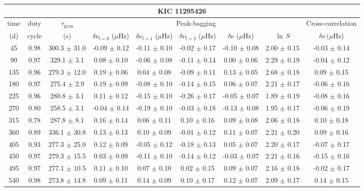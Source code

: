 \documentclass[twocolumn]{aastex61}%
\begin{document}
\begin{table*}[ht]\centering\fontsize{9.}{7.}\selectfont
\begin{tabular}{ccc|ccccc|c}
\multicolumn{9}{c}{KIC 11295426}\\ \hline\hline
time & duty & $\tau_\text{gran}$ &\multicolumn{5}{c|}{Peak-bagging}&Cross-correlation\\
(d)& cycle & (s)&$\delta\nu_{l=0}$ ($\mu$Hz) & $\delta\nu_{l=1}$ ($\mu$Hz) & $\delta\nu_{l=2}$ ($\mu$Hz) & $\delta\nu$ ($\mu$Hz)& $\ln\,S$ & $\delta\nu\,(\mu$Hz)\\\hline
45 & 0.98 & 300.3 $\pm$ 31.0 & -0.09 $\pm$ 0.12 & -0.11 $\pm$ 0.10 & -0.02 $\pm$ 0.17 & -0.10 $\pm$ 0.08 & 2.00 $\pm$ 0.15 & -0.03 $\pm$ 0.14\\
90 & 0.97 & 329.1 $\pm$ 3.1 & 0.08 $\pm$ 0.10 & -0.06 $\pm$ 0.08 & -0.11 $\pm$ 0.14 & 0.00 $\pm$ 0.06 & 2.29 $\pm$ 0.19 & -0.04 $\pm$ 0.12\\
135 & 0.96 & 279.3 $\pm$ 12.0 & 0.19 $\pm$ 0.06 & 0.04 $\pm$ 0.08 & -0.09 $\pm$ 0.11 & 0.13 $\pm$ 0.05 & 2.68 $\pm$ 0.18 & 0.09 $\pm$ 0.15\\
180 & 0.97 & 275.4 $\pm$ 2.9 & 0.19 $\pm$ 0.09 & -0.08 $\pm$ 0.10 & -0.14 $\pm$ 0.15 & 0.06 $\pm$ 0.07 & 2.21 $\pm$ 0.17 & -0.06 $\pm$ 0.16\\
225 & 0.96 & 280.8 $\pm$ 3.1 & 0.11 $\pm$ 0.12 & -0.15 $\pm$ 0.10 & -0.26 $\pm$ 0.17 & -0.05 $\pm$ 0.07 & 1.89 $\pm$ 0.19 & -0.08 $\pm$ 0.16\\
270 & 0.80 & 258.5 $\pm$ 3.1 & -0.04 $\pm$ 0.14 & -0.19 $\pm$ 0.10 & -0.03 $\pm$ 0.18 & -0.13 $\pm$ 0.08 & 1.95 $\pm$ 0.17 & -0.06 $\pm$ 0.19\\
315 & 0.78 & 287.8 $\pm$ 8.1 & 0.16 $\pm$ 0.14 & 0.06 $\pm$ 0.11 & 0.10 $\pm$ 0.16 & 0.09 $\pm$ 0.08 & 2.06 $\pm$ 0.18 & 0.10 $\pm$ 0.18\\
360 & 0.89 & 336.1 $\pm$ 30.8 & 0.13 $\pm$ 0.13 & 0.10 $\pm$ 0.09 & -0.01 $\pm$ 0.12 & 0.11 $\pm$ 0.07 & 2.21 $\pm$ 0.20 & 0.09 $\pm$ 0.16\\
405 & 0.93 & 277.3 $\pm$ 25.0 & 0.12 $\pm$ 0.09 & -0.05 $\pm$ 0.12 & -0.18 $\pm$ 0.13 & 0.05 $\pm$ 0.07 & 2.20 $\pm$ 0.17 & -0.07 $\pm$ 0.17\\
450 & 0.97 & 279.3 $\pm$ 15.5 & 0.03 $\pm$ 0.09 & -0.11 $\pm$ 0.10 & -0.14 $\pm$ 0.12 & -0.03 $\pm$ 0.07 & 2.21 $\pm$ 0.16 & -0.15 $\pm$ 0.16\\
495 & 0.97 & 277.1 $\pm$ 10.5 & 0.11 $\pm$ 0.10 & 0.07 $\pm$ 0.10 & 0.02 $\pm$ 0.15 & 0.09 $\pm$ 0.07 & 2.16 $\pm$ 0.18 & -0.02 $\pm$ 0.17\\
540 & 0.98 & 273.8 $\pm$ 14.8 & 0.09 $\pm$ 0.11 & 0.14 $\pm$ 0.09 & 0.10 $\pm$ 0.17 & 0.12 $\pm$ 0.07 & 2.09 $\pm$ 0.17 & 0.14 $\pm$ 0.15\\

\end{tabular}
\end{table*}
\end{document}
